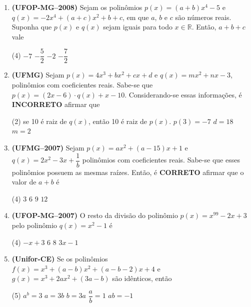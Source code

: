 \documentclass[12pt,a4paper]{article}
\begin{document}
\begin{enumerate}[leftmargin=*, itemsep=0.35cm]
    \item \textbf{(UFOP-MG--2008)} Sejam os polinômios $p(x) = (a + b)x^4 - 5$ e $q(x) = -2x^4 + (a + c)x^2 + b + c$, em que $a$, $b$ e $c$ são números reais. Suponha que $p(x)$ e $q(x)$ sejam iguais para todo $x \in \mathbb{R}$. Então, $a + b + c$ vale
    \begin{tasks}(4)
        \task $-7$
        \task $-\dfrac{5}{2}$
        \task $-2$
        \task $-\dfrac{7}{2}$
    \end{tasks}

    \item \textbf{(UFMG)} Sejam $p(x) = 4x^3 + bx^2 + cx + d$ e $q(x) = mx^2 + nx - 3$, polinômios com coeficientes reais. Sabe-se que $p(x) = (2x - 6) \cdot q(x) + x - 10$. Considerando-se essas informações, é \textbf{INCORRETO} afirmar que
    \begin{tasks}(2)
        \task se 10 é raiz de $q(x)$, então 10 é raiz de $p(x)$.
        \task $p(3) = -7$
        \task $d = 18$
        \task $m = 2$
    \end{tasks}

    \item \textbf{(UFMG--2007)} Sejam $p(x) = ax^2 + (a - 15)x + 1$ e $q(x) = 2x^2 - 3x + \dfrac{1}{b}$ polinômios com coeficientes reais. Sabe-se que esses polinômios possuem as mesmas raízes. Então, é \textbf{CORRETO} afirmar que o valor de $a + b$ é
    \begin{tasks}(4)
        \task $3$
        \task $6$
        \task $9$
        \task $12$
    \end{tasks}

    \item \textbf{(UFOP-MG--2007)} O resto da divisão do polinômio $p(x) = x^{99} - 2x + 3$ pelo polinômio $q(x) = x^2 - 1$ é
    \begin{tasks}(4)
        \task $-x + 3$
        \task $6$
        \task $8$
        \task $3x - 1$
    \end{tasks}

    \item \textbf{(Unifor-CE)} Se os polinômios $f(x) = x^3 + (a - b)x^2 + (a - b - 2)x + 4$ e $g(x) = x^3 + 2ax^2 + (3a - b)$ são idênticos, então
    \begin{tasks}(5)
        \task $a^b = 3$
        \task $a = 3b$
        \task $b = 3a$
        \task $\dfrac{a}{b} = 1$
        \task $ab = -1$
    \end{tasks}
\end{enumerate}
\end{document}
